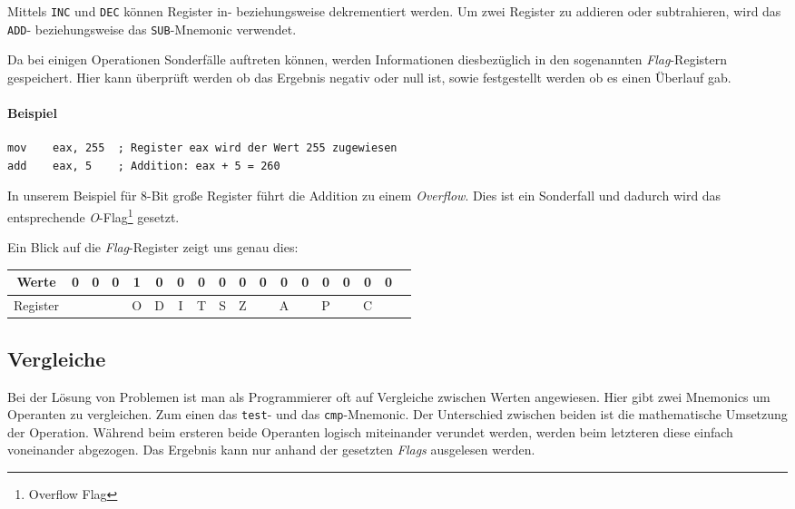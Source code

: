 Mittels \texttt{INC} und \texttt{DEC} können Register in- beziehungsweise dekrementiert werden. Um zwei Register zu addieren oder subtrahieren, wird das \texttt{ADD}- beziehungsweise das \texttt{SUB}-Mnemonic verwendet.

Da bei einigen Operationen Sonderfälle auftreten können, werden Informationen diesbezüglich in den sogenannten \textit{Flag}-Registern gespeichert.
Hier kann überprüft werden ob das Ergebnis negativ oder null ist, sowie festgestellt werden ob es einen Überlauf gab.

\paragraph{Beispiel\newline}\makebox{}

\begin{lstlisting}
mov    eax, 255  ; Register eax wird der Wert 255 zugewiesen
add    eax, 5    ; Addition: eax + 5 = 260 
\end{lstlisting}

In unserem Beispiel für 8-Bit große Register führt die Addition zu einem \textit{Overflow}.
Dies ist ein Sonderfall und dadurch wird das entsprechende \textit{O}-Flag\footnote{Overflow Flag} gesetzt.

Ein Blick auf die \textit{Flag}-Register zeigt uns genau dies:

\begin{tabular}{|c|c|c|c|c|c|c|c|c|c|c|c|c|c|c|c|c|c|}
\hline Werte & 0 & 0 & 0 & 1 & 0 & 0 & 0 & 0 & 0 & 0 & 0 & 0 & 0 & 0 & 0 & 0 \\
\hline Register & & & & O & D & I & T & S & Z & & A & & P & & C \\
\hline
\end{tabular}

\subsection{Vergleiche}
Bei der Lösung von Problemen ist man als Programmierer oft auf Vergleiche zwischen Werten angewiesen.
Hier gibt zwei Mnemonics um Operanten zu vergleichen. Zum einen das \texttt{test}- und das \texttt{cmp}-Mnemonic.
Der Unterschied zwischen beiden ist die mathematische Umsetzung der Operation. Während beim ersteren beide Operanten logisch miteinander verundet werden, werden beim letzteren diese einfach voneinander abgezogen. 
Das Ergebnis kann nur anhand der gesetzten \textit{Flags} ausgelesen werden.

